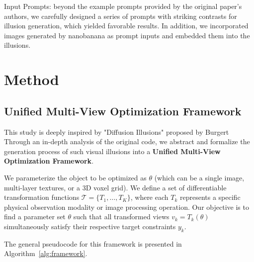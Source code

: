 \documentclass{article}
\begin{document}
Input Prompts: beyond the example prompts provided by the original paper’s authors, we carefully designed a series of prompts with striking contrasts for illusion generation, which yielded favorable results. In addition, we incorporated images generated by nanobanana as prompt inputs and embedded them into the illusions.


\section{Method}
\label{sec:method}

\subsection{Unified Multi-View Optimization Framework}

This study is deeply inspired by "Diffusion Illusions" proposed by Burgert\cite{10.1145/3641519.3657500} Through an in-depth analysis of the original code, we abstract and formalize the generation process of such visual illusions into a \textbf{Unified Multi-View Optimization Framework}.

We parameterize the object to be optimized as $\theta$ (which can be a single image, multi-layer textures, or a 3D voxel grid). We define a set of differentiable transformation functions $\mathcal{T} = \{T_1, \dots, T_K\}$, where each $T_k$ represents a specific physical observation modality or image processing operation. Our objective is to find a parameter set $\theta$ such that all transformed views $v_k = T_k(\theta)$ simultaneously satisfy their respective target constraints $y_k$.

The general pseudocode for this framework is presented in Algorithm~\ref{alg:framework}.
\end{document}
